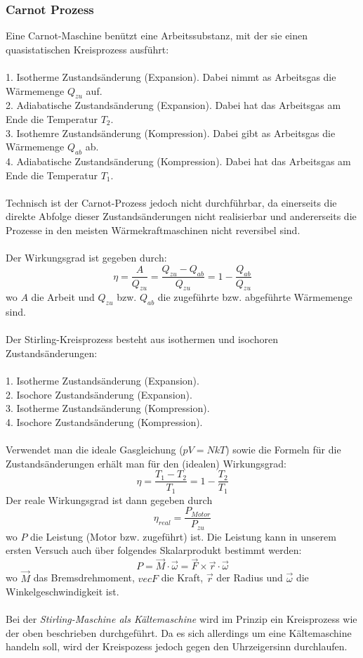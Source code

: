 \documentclass[12pt,a4paper,twopage]{article}
\begin{document}
\subsubsection{Carnot Prozess}
Eine Carnot-Maschine benützt eine Arbeitssubstanz, mit der sie einen quasistatischen Kreisprozess ausführt:\\
\\
1. Isotherme Zustandsänderung (Expansion). Dabei nimmt as Arbeitsgas die Wärmemenge $Q_{zu}$ auf.\\
2. Adiabatische Zustandsänderung (Expansion). Dabei hat das Arbeitsgas am Ende die Temperatur $T_2$.\\
3. Isothemre Zustandsänderung (Kompression). Dabei gibt as Arbeitsgas die Wärmemenge $Q_{ab}$ ab.\\
4. Adiabatische Zustandsänderung (Kompression). Dabei hat das Arbeitsgas am Ende die Temperatur $T_1$.\\
\\
Technisch ist der Carnot-Prozess jedoch nicht durchführbar, da einerseits die direkte Abfolge dieser Zustandsänderungen nicht realisierbar und andererseits die Prozesse in den meisten Wärmekraftmaschinen nicht reversibel sind.\\
\\
Der Wirkungsgrad ist gegeben durch:
$$\eta=\frac{A}{Q_{zu}}=\frac{Q_{zu}-Q_{ab}}{Q_{zu}}=1-\frac{Q_{ab}}{Q_{zu}}$$
wo $A$ die Arbeit und $Q_{zu}$ bzw. $Q_{ab}$ die zugeführte bzw. abgeführte Wärmemenge sind.\\
\\
Der Stirling-Kreisprozess besteht aus isothermen und isochoren Zustandsänderungen:\\
\\
1. Isotherme Zustandsänderung (Expansion).\\
2. Isochore Zustandsänderung (Expansion).\\
3. Isotherme Zustandsänderung (Kompression).\\
4. Isochore Zustandsänderung (Kompression).\\
\\
Verwendet man die ideale Gasgleichung ($pV=NkT$) sowie die Formeln für die Zustandsänderungen erhält man für den (idealen) Wirkungsgrad:
$$\eta=\frac{T_1-T_2}{T_1}=1-\frac{T_2}{T_1}$$
Der reale Wirkungsgrad ist dann gegeben durch
$$\eta_{real}=\frac{P_{Motor}}{P_{zu}}$$
wo $P$ die Leistung (Motor bzw. zugeführt) ist. Die Leistung kann in unserem ersten Versuch auch über folgendes Skalarprodukt bestimmt werden:
$$P=\vec{M}\cdot\vec{\omega}=\vec{F}\times\vec{r}\cdot\vec{\omega}$$
wo $\vec{M}$ das Bremsdrehmoment, $vec{F}$ die Kraft, $\vec{r}$ der Radius und $\vec{\omega}$ die Winkelgeschwindigkeit ist.\\
\\
Bei der \textit{Stirling-Maschine als Kältemaschine} wird im Prinzip ein Kreisprozess wie der oben beschrieben durchgeführt. Da es sich allerdings um eine Kältemaschine handeln soll, wird der Kreispozess jedoch gegen den Uhrzeigersinn durchlaufen.
\end{document}
